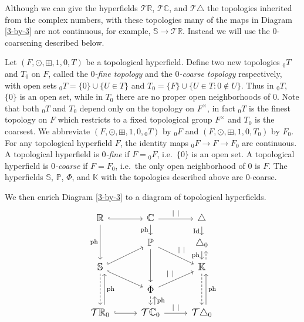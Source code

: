\documentclass[10pt, preprint]{article}
\theoremstyle{definition}
\begin{document}
Although we can give the hyperfields $\mathcal{T }\mathbb{R}$,
$\mathcal{T }\mathbb{C}$, and $\mathcal{T }\triangle $ the topologies
inherited from the complex numbers, with these topologies many of the
maps in Diagram \eqref{3-by-3} are not continuous, for example,
$\mathbb{S}\to \mathcal{T }\mathbb{R}$. Instead we will use the
$0$-coarsening described below.

Let $(F, \odot , \boxplus , 1, 0,T)$ be a topological hyperfield. Define
two new topologies ${_{0}T}$ and $T_{0}$ on $F$, called the
\emph{$0$-fine topology} and the \emph{$0$-coarse topology} respectively,
with open sets ${_{0}T} = \{0\} \cup \{ U \in T \}$ and $T_{0} = \{F
\} \cup \{ U \in T : 0 \notin U \}$. Thus in ${_{0}T}$, $\{0\}$ is an
open set, while in $T_{0}$ there are no proper open neighborhoods of
$0$. Note that both ${_{0}T}$ and $T_{0}$ depend only on the topology
on $F^{\times }$, in fact ${_{0}T}$ is the finest topology on $F$ which
restricts to a fixed topological group $F^{\times }$ and $T_{0}$ is the
coarsest. We abbreviate $(F, \odot , \boxplus , 1, 0,{_{0}T})$ by
${_{0}F}$ and $(F, \odot , \boxplus , 1, 0,T_{0})$ by $F_{0}$. For any
topological hyperfield $F$, the identity maps ${_{0}F} \to F \to F
_{0}$ are continuous. A topological hyperfield is \emph{$0$-fine} if
$F = {_{0}F}$, i.e.~$\{0\}$ is an open set. A topological hyperfield is
\emph{$0$-coarse} if $F = F_{0}$, i.e.~the only open neighborhood of
$0$ is $F$. The hyperfields $\mathbb{S}$, $\mathbb{P}$, $\Phi $, and
$\mathbb{K}$ with the topologies described above are $0$-coarse.

We then enrich Diagram \eqref{3-by-3} to a diagram of topological
hyperfields.
%
\begin{equation}
\label{3-by-3top}
\large
\begin{tikzcd}
[row sep=small] \mathbb R\arrow[r, hook] \arrow[dd,
"\operatorname{ph}"'] &\mathbb C\arrow[r, "|~|"] \arrow[d,
"\operatorname{ph}"'] & \triangle \arrow[d, "\operatorname{Id} "'] \\
&\mathbb P\arrow[dd]\arrow[rd,"|~|"]& \triangle _0 \arrow[d,
"\operatorname{ph}"'] \\ \mathbb S\arrow[ru, hook]\arrow[rd,hook]
\arrow[dd, dashed] & & \mathbb K\arrow[dd, dashed] \arrow[u, shift right
= 1ex, dashed] \\ & \Phi \arrow[ru, "|~|"] \arrow[d, dashed]&
\\ {\mathcal T
}\mathbb R_0 \arrow[r, hook] \arrow[uu, shift right= 1ex,
"\operatorname{ph}"'] & {\mathcal T }\mathbb C_0 \arrow[r, "|~|"] \arrow[u,
shift right= 1ex, "\operatorname{ph}"']&{\mathcal T} \triangle _0 \arrow[uu,
shift right= 1ex, "\operatorname{ph}"']
\end{tikzcd}
%
\end{equation}
\end{document}

